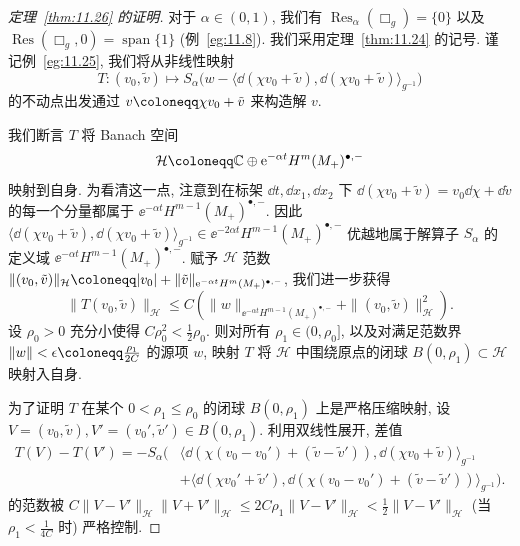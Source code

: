 \begin{proof}[定理~\ref{thm:11.26} 的证明]
对于 $\alpha \in (0, 1)$, 我们有 $\operatorname{Res}_\alpha(\Box_g) = \{0\}$ 以及 $\operatorname{Res}(\Box_g, 0) = \operatorname{span}\{1\}$ (例~\ref{eg:11.8}). 我们采用定理~\ref{thm:11.24} 的记号. 谨记例~\ref{eg:11.25}, 我们将从非线性映射
\begin{equation}\label{eq:11.123}
    T \colon (v_0, \tilde v) \mapsto S_\alpha\big( w - \langle \dd(\chi v_0 + \tilde v), \dd(\chi v_0 + \tilde v) \rangle_{g^{-1}} \big)
\end{equation}
的不动点出发通过 $v \defeq \chi v_0 + \tilde v$ 来构造解 $v$.

我们断言 $T$ 将 Banach 空间
\begin{equation}\label{eq:11.124}
    \mathcal{H} \defeq \mathbb{C} \oplus \ee^{-\alpha t} H^m(M_+)^{\bullet, -}
\end{equation}
映射到自身. 为看清这一点, 注意到在标架 $\dd t, \dd x_1, \dd x_2$ 下 $\dd(\chi v_0 + \tilde v) = v_0 \dd\chi + \dd\tilde v$ 的每一个分量都属于 $\ee^{-\alpha t} H^{m-1}(M_+)^{\bullet, -}$. 因此 $\langle \dd(\chi v_0 + \tilde v), \dd(\chi v_0 + \tilde v) \rangle_{g^{-1}} \in \ee^{-2\alpha t} H^{m-1}(M_+)^{\bullet, -}$ 优越地属于解算子 $S_\alpha$ 的定义域 $\ee^{-\alpha t} H^{m-1}(M_+)^{\bullet, -}$. 赋予 $\mathcal{H}$ 范数 $\|(v_0, \tilde v)\|_{\mathcal{H}} \defeq |v_0| + \|\tilde v\|_{\ee^{-\alpha t} H^m(M_+)^{\bullet, -}}$, 我们进一步获得
\begin{equation}\label{eq:11.125}
    \|T(v_0, \tilde v)\|_{\mathcal{H}} \le C \left( \|w\|_{\ee^{-\alpha t} H^{m-1}(M_+)^{\bullet, -}} + \|(v_0, \tilde v)\|_{\mathcal{H}}^2 \right).
\end{equation}
设 $\rho_0 > 0$ 充分小使得 $C \rho_0^2 < \frac{1}{2}\rho_0$. 则对所有 $\rho_1 \in (0, \rho_0]$, 以及对满足范数界 $\|w\| < \epsilon \defeq \frac{\rho_1}{2C}$ 的源项 $w$, 映射 $T$ 将 $\mathcal{H}$ 中围绕原点的闭球 $B(0, \rho_1) \subset \mathcal{H}$ 映射入自身.

为了证明 $T$ 在某个 $0 < \rho_1 \le \rho_0$ 的闭球 $B(0, \rho_1)$ 上是严格压缩映射, 设 $V = (v_0, \tilde v), V' = (v_0', \tilde v') \in B(0, \rho_1)$. 利用双线性展开, 差值
\begin{equation}\label{eq:11.126}
\begin{aligned}
    T(V) - T(V') = -S_\alpha\Big( & \langle \dd(\chi(v_0 - v_0') + (\tilde v - \tilde v')), \dd(\chi v_0 + \tilde v) \rangle_{g^{-1}} \\
    & + \langle \dd(\chi v_0' + \tilde v'), \dd(\chi(v_0 - v_0') + (\tilde v - \tilde v')) \rangle_{g^{-1}} \Big).
\end{aligned}
\end{equation}
的范数被 $C \|V - V'\|_{\mathcal{H}} \|V + V'\|_{\mathcal{H}} \le 2C \rho_1 \|V - V'\|_{\mathcal{H}} < \frac{1}{2} \|V - V'\|_{\mathcal{H}}$ (当 $\rho_1 < \frac{1}{4C}$ 时) 严格控制.


\end{proof}
